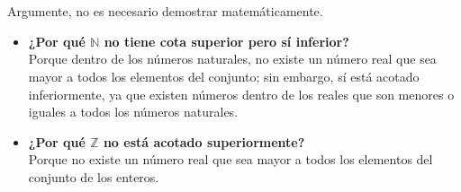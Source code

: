 \documentclass[12pt]{article}
\begin{document}
\section{}
Argumente, no es necesario demostrar matemáticamente. \\
\begin{itemize}
    \item \textbf{¿Por qué $\mathbb{N}$  no tiene cota superior pero sí inferior?} \\
    Porque dentro de los números naturales, no existe un número real que sea mayor
    a todos los elementos del conjunto; sin embargo, sí está acotado inferiormente, ya que 
    existen números dentro de los reales que son menores o iguales a todos los
    números naturales. \\

    \item \textbf{¿Por qué $\mathbb{Z}$  no está acotado superiormente?} \\
    Porque no existe un número real que sea mayor a todos los elementos del conjunto de los 
    enteros. \\
\end{itemize}
\end{document}
